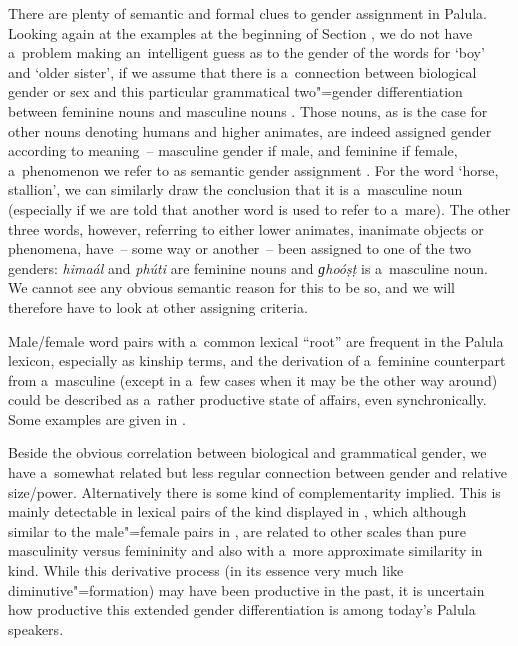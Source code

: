 There are plenty of semantic and formal clues to gender assignment in Palula. Looking again at the examples at the beginning of Section , we do not have a~problem making an~intelligent guess as to the gender of the words for `boy' and `older sister', if we assume that there is a~connection between biological gender or sex and this particular grammatical two"=gender differentiation between feminine nouns and masculine nouns \citep[102]{dahl2000}. Those nouns, as is the case for other nouns denoting humans and higher animates, are indeed assigned gender according to meaning~-- masculine gender if male, and feminine if female, a~phenomenon we refer to as semantic gender assignment \citep[7--32]{corbett1991}. For the word `horse, stallion', we can similarly draw the conclusion that it is a~masculine noun (especially if we are told that another word is used to refer to a~mare). The other three words, however, referring to either lower animates, inanimate objects or phenomena, have~-- some way or another~-- been assigned to one of the two genders: \textit{himaál} and \textit{phúti} are feminine nouns and \textit{ɡhoóṣṭ} is a~masculine noun. We cannot see any obvious semantic reason for this to be so, and we will therefore have to look at other assigning criteria.


Male/female word pairs with a~common lexical ``root'' are frequent in the Palula lexicon, especially as kinship terms, and the derivation of a~feminine counterpart from a~masculine (except in a~few cases when it may be the other way around) could be described as a~rather productive state of affairs, even synchronically. Some examples are given in .


Beside the obvious correlation between biological and grammatical gender, we have a~somewhat related but less regular connection between gender and relative size/power. Alternatively there is some kind of complementarity implied. This is mainly detectable in lexical pairs of the kind displayed in , which although similar to the male"=female pairs in , are related to other scales than pure masculinity versus femininity and also with a~more approximate similarity in kind. While this derivative process (in its essence very much like diminutive"=formation) may have been productive in the past, it is uncertain how productive this extended gender differentiation is among today's Palula speakers.



